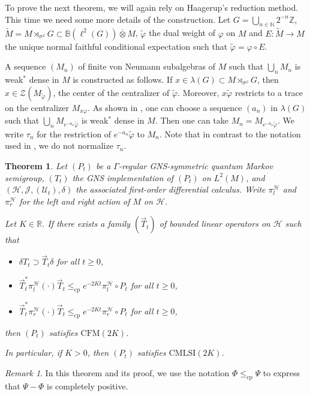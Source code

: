 \documentclass[12pt,a4paper]{amsart}
\newcommand{\1}{\mathds{1}}
\renewcommand{\phi}{\varphi}
\renewcommand{\H}{\mathcal H}
\newcommand{\J}{\mathcal J}
\newcommand{\U}{\mathcal U}
\newcommand{\IB}{\mathbb B}
\newcommand{\IN}{\mathbb N}
\newcommand{\IZ}{\mathbb Z}
\newcommand{\cp}{\mathrm{cp}}
\theoremstyle{plain}
\newtheorem{theorem}[proposition]{Theorem}
\theoremstyle{definition}
\theoremstyle{remark}
\newtheorem{remark}[proposition]{Remark}
\begin{document}
To prove the next theorem, we will again rely on Haagerup's reduction method. This time we need some more details of the construction. Let $G=\bigcup_{n\in\IN}2^{-n}\IZ$, $\tilde M=M\rtimes_{\sigma^\phi} G\subset \IB(\ell^2(G))\overline{\otimes} M$, $\tilde\phi$ the dual weight of $\phi$ on $M$ and $E\colon \tilde M\to M$ the unique normal faithful conditional expectation such that $\tilde\phi=\phi\circ E$.

A sequence $(M_n)$ of finite von Neumann subalgebras of $M$ such that $\bigcup_n M_n$ is weak$^\ast$ dense in $M$ is constructed as follows. If $x\in \lambda(G)\subset M\rtimes_{\sigma^\phi}G$, then $x\in \mathcal Z(M_{\tilde \phi})$, the center of the centralizer of $\tilde\phi$. Moreover, $x\tilde\phi$ restricts to a trace on the centralizer $M_{x\phi}$. As shown in \cite[Section 2]{HJX10}, one can choose a sequence $(a_n)$ in $\lambda(G)$ such that $\bigcup_n M_{e^{-a_n}\tilde\phi}$ is weak$^\ast$ dense in $M$. Then one can take $M_n=M_{e^{-a_n}\tilde\phi}$. We write $\tau_n$ for the restriction of $e^{-a_n}\tilde\phi$ to $M_n$. Note that in contrast to the notation used in \cite{HJX10}, we do not normalize $\tau_n$.

\begin{theorem}\label{thm:intertwining}
Let $(P_t)$ be a $\Gamma$-regular GNS-symmetric quantum Markov semigroup, $(T_t)$ the GNS implementation of $(P_t)$ on $L^2(M)$, and $(\H,\J,(\U_t),\delta)$ the associated first-order differential calculus. Write $\pi_l^\H$ and $\pi_r^\H$ for the left and right action of $M$ on $\H$. 

Let $K\in\mathbb R$. If there exists a family $(\vec T_t)$ of bounded linear operators on $\H$ such that
\begin{itemize}
\item $\delta T_t\supset\vec T_t\delta$ for all $t\geq 0$,
\item $\vec T_t^\ast \pi_l^\H(\cdot)\vec T_t\leq_{\cp}e^{-2Kt} \pi_l^\H\circ P_t$ for all $t\geq 0$,
\item $\vec T_t^\ast \pi_r^\H(\cdot)\vec T_t\leq_{\cp}e^{-2Kt} \pi_r^\H\circ P_t$ for all $t\geq 0$,
\end{itemize}
then $(P_t)$ satisfies $\mathrm{CFM}(2K)$.

In particular, if $K>0$, then $(P_t)$ satisfies $\mathrm{CMLSI}(2K)$.
\end{theorem}

\begin{remark}
    In this theorem and its proof, we use the notation $\Phi\leq_{\mathrm{cp}}\Psi$ to express that $\Psi-\Phi$ is completely positive.
\end{remark}
\end{document}

